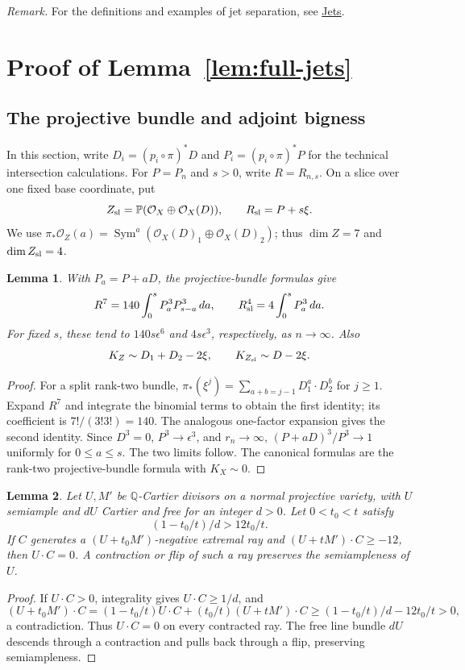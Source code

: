 \documentclass[12pt,a4paper,psamsfonts]{amsart}
\theoremstyle{definition}
\theoremstyle{plain}
\newtheorem{lemma}{Lemma}[section]
\newcommand{\OO}{\mathcal O}
\begin{document}
\noindent\textit{Remark.} For the definitions and examples of jet separation,
see \href{https://birationalclass.github.io/shengmeng/study/abundance/jets.html}{Jets}.

\section{Proof of Lemma~\ref{lem:full-jets}}\label{sec:large-jets}



\subsection{The projective bundle and adjoint bigness}

In this section, write $D_i=(p_i\circ\pi)^*D$ and
$P_i=(p_i\circ\pi)^*P$ for the technical intersection calculations.
For $P=P_n$ and $s>0$, write $R=R_{n,s}$. On a slice over one fixed
base coordinate, put
\[
 Z_{\rm sl}=\mathbb P(\OO_X\oplus\OO_X(D)),\qquad
 R_{\rm sl}=P+s\xi.
\]
We use $\pi_*\OO_Z(a)=\operatorname{Sym}^a
(\OO_X(D)_1\oplus\OO_X(D)_2)$; thus $\dim Z=7$ and
$\dim Z_{\rm sl}=4$.

\begin{lemma}\label{lem:bundle-volume}
With $P_a=P+aD$, the projective-bundle formulas give
\[
 R^7=140\int_0^s P_a^3P_{s-a}^3\,da,\qquad
 R_{\rm sl}^4=4\int_0^s P_a^3\,da.
\]
For fixed $s$, these tend to $140s\epsilon^6$ and
$4s\epsilon^3$, respectively, as $n\to\infty$. Also
\[
 K_Z\sim D_1+D_2-2\xi,\qquad K_{Z_{\rm sl}}\sim D-2\xi.
\]
\end{lemma}
\begin{proof}
For a split rank-two bundle,
$\pi_*(\xi^j)=\sum_{a+b=j-1}D_1^a\cdot D_2^b$ for $j\ge1$.
Expand $R^7$ and integrate the binomial terms to obtain the first
identity; its coefficient is $7!/(3!3!)=140$.
The analogous one-factor expansion gives the second identity.
Since $D^3=0$, $P^3\to\epsilon^3$, and $r_n\to\infty$,
$(P+aD)^3/P^3\to1$ uniformly for $0\le a\le s$.
The two limits follow. The canonical formulas are the rank-two
projective-bundle formula with $K_X\sim0$.
\end{proof}

\begin{lemma}\label{lem:semiample-trivial-rays}
Let $U,M'$ be $\mathbb{Q}$-Cartier divisors on a normal projective
variety, with $U$ semiample and $dU$ Cartier and free for an
integer $d>0$. Let $0<t_0<t$ satisfy
\[
 (1-t_0/t)/d>12t_0/t.
\]
If $C$ generates a $(U+t_0M')$-negative extremal ray and
$(U+tM')\cdot C\ge-12$, then $U\cdot C=0$. A contraction or flip of such
a ray preserves the semiampleness of $U$.
\end{lemma}
\begin{proof}
If $U\cdot C>0$, integrality gives $U\cdot C\ge1/d$, and
\[
 (U+t_0M')\cdot C=(1-t_0/t)U\cdot C+(t_0/t)(U+tM')\cdot C
 \ge(1-t_0/t)/d-12t_0/t>0,
\]
a contradiction. Thus $U\cdot C=0$ on every contracted ray.
The free line bundle $dU$ descends through a contraction and
pulls back through a flip, preserving semiampleness.
\end{proof}
\end{document}
